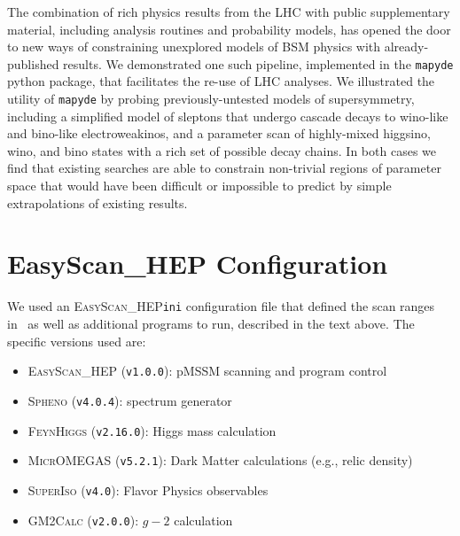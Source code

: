 \documentclass{article}
\newcommand{\mapyde}{\texttt{mapyde}}
\newcommand{\easyscanhep}{\textsc{EasyScan\_HEP}}
\newcommand{\spheno}{\textsc{Spheno}}
\newcommand{\feynhiggs}{\textsc{FeynHiggs}}
\newcommand{\micromegas}{\textsc{MicrOMEGAS}}
\newcommand{\superiso}{\textsc{SuperIso}}
\newcommand{\gmtwocalc}{\textsc{GM2Calc}}
\begin{document}
The combination of rich physics results from the LHC with public supplementary material, including analysis routines and probability models, has opened the door to new ways of constraining unexplored models of BSM physics with already-published results.  We demonstrated one such pipeline, implemented in the \mapyde{} python package, that facilitates the re-use of LHC analyses.  We illustrated the utility of \mapyde{} by probing previously-untested models of supersymmetry, including a simplified model of sleptons that undergo cascade decays to wino-like and bino-like electroweakinos, and a parameter scan of highly-mixed higgsino, wino, and bino states with a rich set of possible decay chains.  In both cases we find that existing searches are able to constrain non-trivial regions of parameter space that would have been difficult or impossible to predict by simple extrapolations of existing results.

\printbibliography

\appendix

\section{EasyScan\_HEP Configuration}
\label{sec:easyscan-hep-configuration}

We used an \easyscanhep \texttt{ini} configuration file that defined the scan ranges in~ as well as additional programs to run, described in the text above. The specific versions used are:

\begin{itemize}
	\item \easyscanhep{} (\texttt{v1.0.0}): pMSSM scanning and program control~\cite{Shang:2023gfy,Han:2016gvr}
	\item \spheno{} (\texttt{v4.0.4}): spectrum generator~\cite{Porod:2003um,Porod:2011nf}
	\item \feynhiggs{} (\texttt{v2.16.0}): Higgs mass calculation~\cite{Bahl:2018qog,Bahl:2017aev,Bahl:2016brp,Hahn:2013ria,Frank:2006yh,Degrassi:2002fi,Heinemeyer:1998np,Heinemeyer:1998yj}
	\item \micromegas{} (\texttt{v5.2.1}): Dark Matter calculations (e.g., relic density)~\cite{Belanger:2020gnr}
	\item \superiso{} (\texttt{v4.0}): Flavor Physics observables~\cite{Arbey:2018msw}
	\item \gmtwocalc{} (\texttt{v2.0.0}): $g-2$ calculation~\cite{Athron:2015rva,Athron:2021evk}
\end{itemize}
\end{document}
